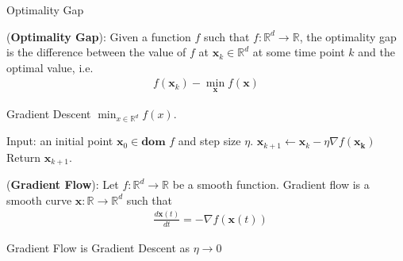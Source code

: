 \documentclass{beamer}
\def\reals{\mathbb{R}}
\begin{document}
\begin{frame}{Optimality Gap}

\begin{definition}
(\textbf{Optimality Gap}): Given a function $f$ such that $f: \reals^d \to \reals$, the optimality gap is the difference between the value of $f$ at $\mathbf{x}_k \in \reals^d$ at some time point $k$ and the optimal value, i.e.
\begin{align*}
    f(\mathbf{x}_k) - \min_{\mathbf{x}} f(\mathbf{x})%
\end{align*}
\end{definition}


\end{frame}




\begin{frame}{Gradient Descent}
\Large 
$\min_{x \in \reals^d} f(x)$. 

\begin{algorithm}[H]
\begin{algorithmic}[1]
\Large 
\STATE Input: an initial point $\mathbf{x}_{0} \in \textbf{dom }f$ and step size $\eta$.
\STATE $\mathbf{x}_{k+1} \leftarrow \mathbf{x}_{k} - \eta \nabla f \left( \mathbf{x_{k}} \right)$
\ENDFOR
\STATE Return $\mathbf{x}_{k+1}$.
\end{algorithmic}
\end{algorithm}


\end{frame}


\begin{frame}{}

\Large 
(\textbf{Gradient Flow}): 
Let $f: \reals^d \to \reals$ be a smooth function. Gradient flow is a smooth curve $\mathbf{x}: \reals \to \reals^d$ such that
\begin{align*}
    &\frac{d\mathbf{x}(t)}{dt} = - \nabla f \left( \mathbf{x}(t) \right) 
\end{align*}

\end{frame}

\begin{frame}{Gradient Flow is Gradient Descent as $\eta \rightarrow 0$}

\end{frame}
\end{document}
